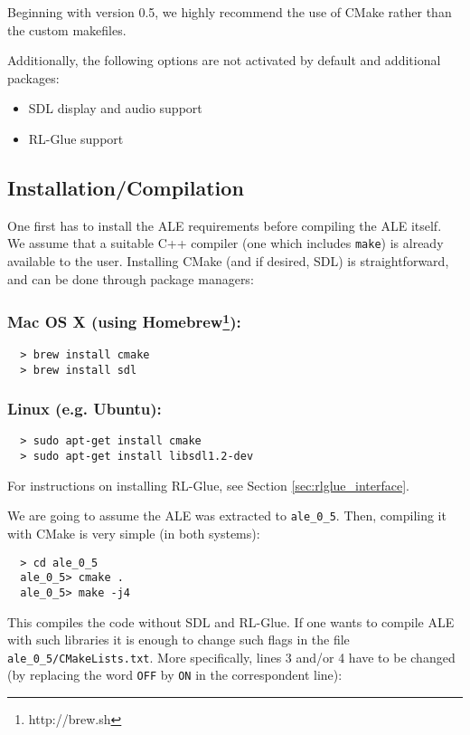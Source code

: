\documentclass[12pt]{article}
\begin{document}
Beginning with version 0.5, we highly recommend the use of CMake rather than the custom makefiles.

Additionally, the following options are not activated by default and additional packages:
\begin{itemize}
  \item SDL display and audio support
  \item RL-Glue support
\end{itemize}

\subsection{Installation/Compilation}\label{subsec:installation_compilation}

One first has to install the ALE requirements before compiling the ALE itself. 
We assume that a suitable C++ compiler (one which includes \verb+make+) is already available to 
the user. Installing CMake (and if desired, SDL) is straightforward, and can be done through 
package managers: 

\subsubsection*{Mac OS X (using Homebrew\footnote{http://brew.sh}):}
\begin{verbatim}
  > brew install cmake
  > brew install sdl
\end{verbatim}

\subsubsection*{Linux (e.g. Ubuntu):}
\begin{verbatim}
  > sudo apt-get install cmake
  > sudo apt-get install libsdl1.2-dev
\end{verbatim}

For instructions on installing RL-Glue, see Section \ref{sec:rlglue_interface}.

We are going to assume the ALE was extracted to \verb+ale_0_5+. Then, compiling it
with CMake is very simple (in both systems):
\begin{verbatim}
  > cd ale_0_5
  ale_0_5> cmake .
  ale_0_5> make -j4
\end{verbatim}

This compiles the code without SDL and RL-Glue. If one wants to compile ALE with such libraries it 
is enough to change such flags in the file \verb+ale_0_5/CMakeLists.txt+. More specifically, lines
3 and/or 4 have to be changed (by replacing the word \verb+OFF+ by \verb+ON+ in the
correspondent line):
\end{document}
